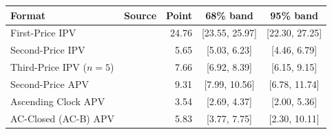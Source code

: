 \begin{tabular}{llrcc}
\toprule
Format & Source & Point & 68\% band & 95\% band \\
\midrule
First-Price IPV & \citet{kagel1993independent} & 24.76 & [23.55, 25.97] & [22.30, 27.25] \\
Second-Price IPV & \citet{kagel1993independent} & 5.65 & [5.03, 6.23] & [4.46, 6.79] \\
Third-Price IPV ($n=5$) & \citet{kagel1993independent} & 7.66 & [6.92, 8.39] & [6.15, 9.15] \\
Second-Price APV & \citet{li2017obviously} & 9.31 & [7.99, 10.56] & [6.78, 11.74] \\
Ascending Clock APV & \citet{li2017obviously} & 3.54 & [2.69, 4.37] & [2.00, 5.36] \\
AC-Closed (AC-B) APV & \citet{breitmoser2022obviousness} & 5.83 & [3.77, 7.75] & [2.30, 10.11] \\
\bottomrule
\end{tabular}

